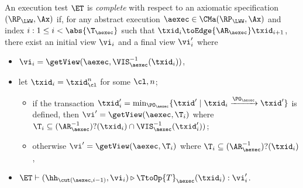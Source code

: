 \begin{definition}
\label{def:et_complete}
An execution test $\ET$ is \emph{complete} with respect 
to an axiomatic specification $(\RP_{\LWW}, \Ax)$ if, for any abstract execution $\aexec \in \CMa(\RP_{\LWW}, \Ax)$ 
and index \( i : 1 \leq i < \abs{\T_{\aexec}}\) such that \( \txid_{i} \toEdge{\AR_{\aexec}} \txid_{i+1} \), there exist an initial view $\vi_{i}$ and a final view $\vi_{i}'$ where 
\begin{itemize}
\item $\vi_{i} = \getView(\aexec, \VIS_{\aexec}^{-1}(\txid_{i}))$, 
\item let $\txid_{i} = \txid_{\cl}^{n}$ for some $\cl, n$; 
    \begin{itemize}
        \item if the transaction $\txid_{i}' = \min_{\PO_{\aexec}}\{\txid' \mid \txid_i \xrightarrow{\PO_{\aexec}} \txid'\}$ is defined, then $\vi' = \getView(\aexec, \T_{i})$ where $\T_{i} \subseteq (\AR_{\aexec}^{-1})?(\txid_{i}) \cap \VIS_{\aexec}^{-1}(\txid_{i}'))$; 
        \item otherwise $\vi' = \getView(\aexec, \T_{i})$ where $\T_{i} \subseteq (\AR_{\aexec}^{-1})?(\txid_{i})$, 
    \end{itemize}
\item $\ET \vdash (\hh_{\cut(\aexec, i-1)}, \vi_{i}) \triangleright \TtoOp{T}_{\aexec}(\txid_{i}) : \vi_{i}'$.
\end{itemize}
\end{definition}

